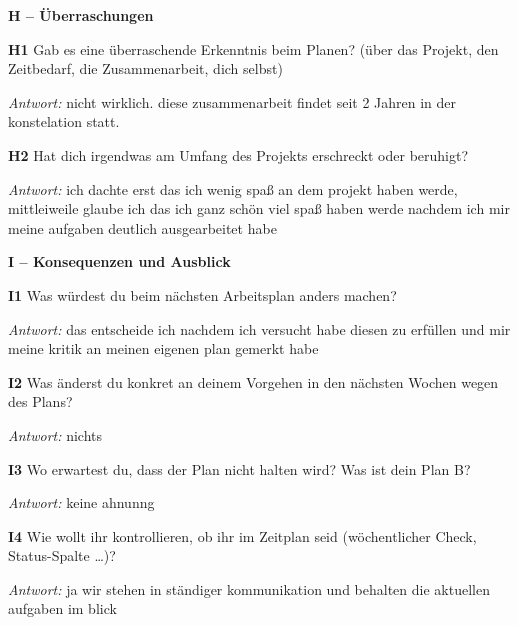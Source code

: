 {\par\medskip\noindent\textbf{H – Überraschungen}\par
\par\noindent \textbf{H1} Gab es eine überraschende Erkenntnis beim Planen? (über das Projekt, den Zeitbedarf, die Zusammenarbeit, dich selbst)\par
\par\noindent\emph{Antwort:} nicht wirklich. diese zusammenarbeit findet seit 2 Jahren in der konstelation statt.\par\smallskip
\par\noindent \textbf{H2} Hat dich irgendwas am Umfang des Projekts erschreckt oder beruhigt?\par
\par\noindent\emph{Antwort:} ich dachte erst das ich wenig spaß an dem projekt haben werde, mittleiweile glaube ich das ich ganz schön viel spaß haben werde nachdem ich mir meine aufgaben deutlich ausgearbeitet habe\par\smallskip
\par\medskip\noindent\textbf{I – Konsequenzen und Ausblick}\par
\par\noindent \textbf{I1} Was würdest du beim nächsten Arbeitsplan anders machen?\par
\par\noindent\emph{Antwort:} das entscheide ich nachdem ich versucht habe diesen zu erfüllen und mir meine kritik an meinen eigenen plan gemerkt habe\par\smallskip
\par\noindent \textbf{I2} Was änderst du konkret an deinem Vorgehen in den nächsten Wochen wegen des Plans?\par
\par\noindent\emph{Antwort:} nichts\par\smallskip
\par\noindent \textbf{I3} Wo erwartest du, dass der Plan nicht halten wird? Was ist dein Plan B?\par
\par\noindent\emph{Antwort:} keine ahnunng\par\smallskip
\par\noindent \textbf{I4} Wie wollt ihr kontrollieren, ob ihr im Zeitplan seid (wöchentlicher Check, Status-Spalte …)?\par
\par\noindent\emph{Antwort:} ja wir stehen in ständiger kommunikation und behalten die aktuellen aufgaben im blick\par\smallskip
}
